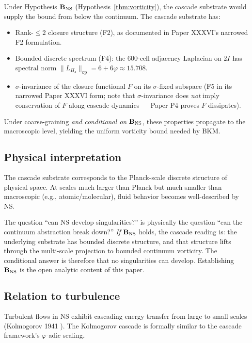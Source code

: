 \documentclass[11pt, a4paper]{amsart}
\theoremstyle{definition}
\newcommand{\pphi}{\varphi}
\begin{document}
Under Hypothesis $\mathbf{B_{\rm NS}}$ (Hypothesis~\ref{thm:vorticity}),
the cascade substrate would supply the bound from below the continuum.
The cascade substrate has:
\begin{itemize}
\item Rank-$\leq 2$ closure structure (F2), as documented in
    Paper XXXVI's narrowed F2 formulation.
\item Bounded discrete spectrum (F4): the 600-cell adjacency
    Laplacian on $2I$ has spectral norm
    $\|L_{H_4}\|_{\mathrm{op}} = 6+6\varphi \approx 15.708$.
\item $\sigma$-invariance of the closure functional $F$ on its
    $\sigma$-fixed subspace (F5 in its narrowed Paper XXXVI form;
    note that $\sigma$-invariance does \emph{not} imply conservation
    of $F$ along cascade dynamics — Paper P4 proves $F$ dissipates).
\end{itemize}

Under coarse-graining \emph{and conditional on $\mathbf{B_{\rm NS}}$},
these properties propagate to the macroscopic level, yielding the
uniform vorticity bound needed by BKM.

\subsection{Physical interpretation}

The cascade substrate corresponds to the Planck-scale discrete
structure of physical space. At scales much larger than Planck but
much smaller than macroscopic (e.g., atomic/molecular), fluid
behavior becomes well-described by NS.

The question ``can NS develop singularities?'' is physically the
question ``can the continuum abstraction break down?'' \emph{If}
$\mathbf{B_{\rm NS}}$ holds, the cascade reading is: the underlying
substrate has bounded discrete structure, and that structure lifts
through the multi-scale projection to bounded continuum vorticity.
The conditional answer is therefore that no singularities can
develop. Establishing $\mathbf{B_{\rm NS}}$ is the open analytic
content of this paper.

\subsection{Relation to turbulence}

Turbulent flows in NS exhibit cascading energy transfer from large
to small scales (Kolmogorov 1941 \cite{Kolmogorov1941}). The Kolmogorov
cascade is formally similar to the cascade framework's $\pphi$-adic
scaling.
\end{document}
